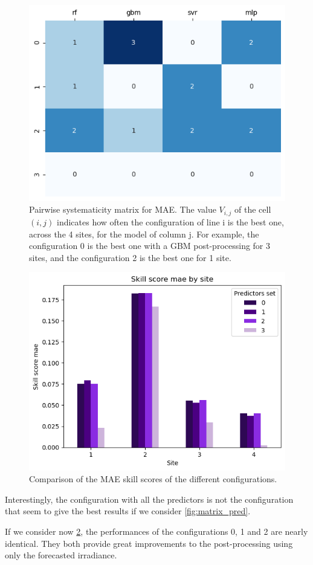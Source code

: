 \newpage
\begin{figure}[htb!]
    \centering
    \includegraphics[width=0.6\columnwidth]{figures/first_study/comp_predictors_mae.png}
\caption{Pairwise systematicity matrix for MAE. The value $V_{i,j}$ of the cell $(i,j)$ indicates how often the configuration of line i is the best one, across the 4 sites, for the model of column j. For example, the configuration 0 is the best one with a GBM post-processing for 3 sites, and the configuration 2 is the best one for 1 site.}
\label{fig:matrix_pred}
\end{figure}

\begin{figure}[htb!]
    \centering
    \includegraphics[width=0.72\columnwidth]{figures/first_study/comp_predictors_mae_svr.png}
\caption{Comparison of the MAE skill scores of the different configurations.}
    \label{fig:ss_pred}
\end{figure}

\newpage
Interestingly, the configuration with all the predictors is not the configuration that seem to give the best results if we consider \autoref{fig:matrix_pred}.

If we consider now \ref{fig:ss_pred}, the performances of the configurations 0, 1 and 2 are nearly identical. They both provide great improvements to the post-processing using only the forecasted irradiance.

